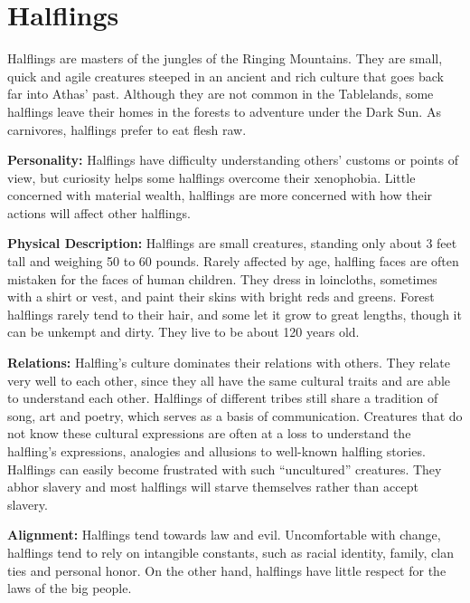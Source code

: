 \section{Halflings}

Halflings are masters of the jungles of the Ringing Mountains. They are small, quick and agile creatures steeped in an ancient and rich culture that goes back far into Athas' past. Although they are not common in the Tablelands, some halflings leave their homes in the forests to adventure under the {\tableheader Dark Sun}. As carnivores, halflings prefer to eat flesh raw.

\textbf{Personality:} Halflings have difficulty understanding others' customs or points of view, but curiosity helps some halflings overcome their xenophobia. Little concerned with material wealth, halflings are more concerned with how their actions will affect other halflings.

\textbf{Physical Description:} Halflings are small creatures, standing only about 3 \onehalf feet tall and weighing 50 to 60 pounds. Rarely affected by age, halfling faces are often mistaken for the faces of human children. They dress in loincloths, sometimes with a shirt or vest, and paint their skins with bright reds and greens. Forest halflings rarely tend to their hair, and some let it grow to great lengths, though it can be unkempt and dirty. They live to be about 120 years old.

\textbf{Relations:} Halfling's culture dominates their relations with others. They relate very well to each other, since they all have the same cultural traits and are able to understand each other. Halflings of different tribes still share a tradition of song, art and poetry, which serves as a basis of communication. Creatures that do not know these cultural expressions are often at a loss to understand the halfling's expressions, analogies and allusions to well-known halfling stories. Halflings can easily become frustrated with such ``uncultured'' creatures. They abhor slavery and most halflings will starve themselves rather than accept slavery.

\textbf{Alignment:} Halflings tend towards law and evil. Uncomfortable with change, halflings tend to rely on intangible constants, such as racial identity, family, clan ties and personal honor. On the other hand, halflings have little respect for the laws of the big people.

